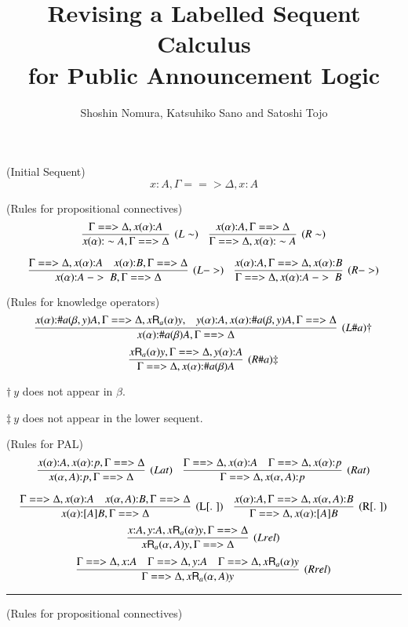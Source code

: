 \documentclass{paper}
\begin{document}
\title{Revising a Labelled Sequent Calculus\\ for  Public Announcement Logic}
\author{Shoshin Nomura, Katsuhiko Sano and Satoshi Tojo}



\begin{table}[t]
\caption{G3PAL'}
\label{tb:table2}
\noindent (Initial Sequent)
\[
  x{:} A, \Gamma ==> \Delta, x{:} A
\]

\noindent (Rules for propositional connectives)
\[
  \infer[(L\sim )]{
    x(\alpha){:} \sim A,\Gamma ==> \Delta
  }{
    \Gamma ==> \Delta,x(\alpha){:} A
  }
\quad
  \infer[(R\sim)]{
    \Gamma ==> \Delta,x(\alpha){:} \sim A
  }{
    x(\alpha){:} A,\Gamma ==> \Delta
  }
\]

\[
  \infer[(L->)]{
    x(\alpha){:} A\ ->\ B,\Gamma ==> \Delta
  }{
    \Gamma ==> \Delta,x(\alpha){:} A
    &
    x(\alpha){:} B,\Gamma ==> \Delta
  }
\quad
  \infer[(R->)]{
    \Gamma ==> \Delta,x(\alpha){:} A\ ->\ B
  }{
    x(\alpha){:} A,\Gamma ==> \Delta, x(\alpha){:} B
  }
\]

\noindent (Rules for knowledge operators)
\[
  \infer[(L\#a)$\dag$]{
    x(\alpha){:} \#a(\beta)A,\Gamma ==> \Delta
  }{
     x(\alpha){:} \#a(\beta,y)A,\Gamma ==> \Delta,x\mathsf{R}_a(\alpha)y,
    &
    y(\alpha){:} A,   x(\alpha){:} \#a(\beta,y)A,\Gamma ==> \Delta
  }
\]
\[  \infer[(R\#a)$\ddag$]{
    \Gamma ==> \Delta,x(\alpha){:} \#a(\beta)A
  }{
    x\mathsf{R}_a(\alpha)y,\Gamma ==> \Delta,y(\alpha){:} A
  }
\]
\begin{center}
 $\dag\ y$ does not appear in $\beta$. 

 $\ddag\ y$ does not appear in the lower sequent. 
\end{center}

\noindent (Rules for PAL)
\[
  \infer[(Lat)]{
    x(\alpha,A){:} p,\Gamma ==> \Delta
  }{
    x(\alpha){:} A ,x(\alpha){:} p ,\Gamma ==> \Delta
  }
\quad
  \infer[(Rat)]{
    \Gamma ==> \Delta,x(\alpha,A){:} p
  }{
    \Gamma ==> \Delta,x(\alpha){:} A
    &
    \Gamma ==> \Delta,x(\alpha){:} p
  }
\]

\[
  \infer[\mbox{(L[. ])}]{
    x(\alpha){:} [A]B,\Gamma ==> \Delta
  }{
    \Gamma ==> \Delta,x(\alpha){:} A
    &
    x(\alpha,A){:} B,\Gamma ==> \Delta
  }
\quad
  \infer[\mbox{(R[. ])}]{
    \Gamma ==> \Delta,x(\alpha){:} [A]B
  }{
    x(\alpha){:} A,\Gamma ==> \Delta,x(\alpha,A){:} B
  }
\]
\[
  \infer[(Lrel)]{
    x\mathsf{R}_a(\alpha,A)y,\Gamma ==> \Delta
  }{
    x{:}A,y{:}A,x\mathsf{R}_a(\alpha)y,\Gamma ==> \Delta
  }
\]
\[
  \infer[(Rrel)]{
    \Gamma ==> \Delta,x\mathsf{R}_a(\alpha,A)y
  }{
    \Gamma ==> \Delta,x{:}A
    &
    \Gamma ==> \Delta,y{:}A
    &
    \Gamma ==> \Delta,x\mathsf{R}_a(\alpha)y
  }
\]
\hrule
\noindent (Rules for propositional connectives)


\end{table}
\end{document}
